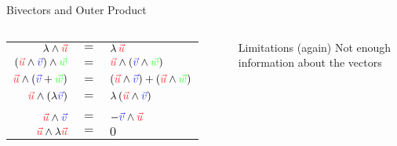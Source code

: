 \begin{frame}[t]{Bivectors and Outer Product}

    \begin{center}
    \end{center}

    \begin{columns}

        {
            \begin{tabular}{rcl}
                $\lambda \wedge \textcolor{u}{\vec{u}}$                                                & $=$ & $\lambda\,\textcolor{u}{\vec{u}}$                                                                                 \\
                $(\textcolor{u}{\vec{u}} \wedge \textcolor{v}{\vec{v}}) \wedge \textcolor{w}{\vec{w}}$ & $=$ & $\textcolor{u}{\vec{u}} \wedge (\textcolor{v}{\vec{v}} \wedge \textcolor{w}{\vec{w}})$                            \\
                $\textcolor{u}{\vec{u}} \wedge (\textcolor{v}{\vec{v}} + \textcolor{w}{\vec{w}})$      & $=$ & $(\textcolor{u}{\vec{u}} \wedge \textcolor{v}{\vec{v}}) + (\textcolor{u}{\vec{u}} \wedge \textcolor{w}{\vec{w}})$ \\
                $\textcolor{u}{\vec{u}} \wedge (\lambda \textcolor{v}{\vec{v}})$                       & $=$ & $\lambda\,(\textcolor{u}{\vec{u}} \wedge \textcolor{v}{\vec{v}})$                                                 \\
                \\
                $\textcolor{u}{\vec{u}} \wedge \textcolor{v}{\vec{v}}$                                 & $=$ & $-\textcolor{v}{\vec{v}} \wedge \textcolor{u}{\vec{u}}$                                                           \\
                $\textcolor{u}{\vec{u}} \wedge \lambda \textcolor{u}{\vec{u}}$                         & $=$ & $0$                                                                                                               \\
            \end{tabular}
        }

        \vspace{2em}

        {
            \begin{alertblock}{Limitations (again)}
                Not enough information about the vectors
            \end{alertblock}
        }



\end{columns}
\end{frame}
